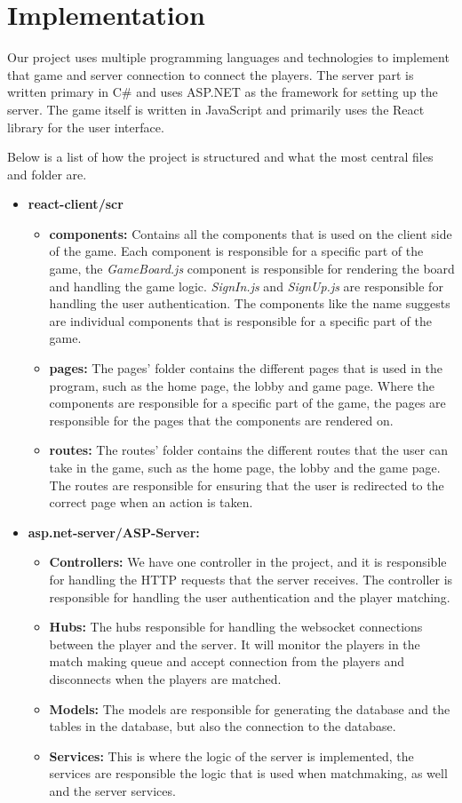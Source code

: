 \documentclass[ twoside,openright,titlepage,numbers=noenddot,headinclude,%
                footinclude=true,cleardoublepage=empty,abstractoff, %
                BCOR=5mm,paper=a4,fontsize=11pt,%
                ngerman,american,%
                ]{scrreprt}
\begin{document}
\section{Implementation}
Our project uses multiple programming languages and technologies to implement that game and server connection to connect the players. The server part is written primary in C\# and uses ASP.NET as the framework for setting up the server. The game itself is written in JavaScript and primarily uses the React library for the user interface.

Below is a list of how the project is structured and what the most central files and folder are.
\begin{itemize}
  \item \textbf{react-client/scr}
  \begin{itemize}
    \item \textbf{components:} Contains all the components that is used on the client side of the game. Each component is responsible for a specific part of the game, the \textit{GameBoard.js} component is responsible for rendering the board and handling the game logic. \textit{SignIn.js} and \textit{SignUp.js} are responsible for handling the user authentication. The components like the name suggests are individual components that is responsible for a specific part of the game. 
    \item \textbf{pages:} The pages' folder contains the different pages that is used in the program, such as the home page, the lobby and game page. Where the components are responsible for a specific part of the game, the pages are responsible for the pages that the components are rendered on.
    \item \textbf{routes:} The routes' folder contains the different routes that the user can take in the game, such as the home page, the lobby and the game page. The routes are responsible for ensuring that the user is redirected to the correct page when an action is taken.
  \end{itemize}
  \item \textbf{asp.net-server/ASP-Server:}
  \begin{itemize}
    \item \textbf{Controllers:} We have one controller in the project, and it is responsible for handling the HTTP requests that the server receives. The controller is responsible for handling the user authentication and the player matching.
    \item \textbf{Hubs:} The hubs responsible for handling the websocket connections between the player and the server. It will monitor the players in the match making queue and accept connection from the players and disconnects when the players are matched. 
    \item \textbf{Models:} The models are responsible for generating the database and the tables in the database, but also the connection to the database.   
    \item \textbf{Services:} This is where the logic of the server is implemented, the services are responsible the logic that is used when matchmaking, as well and the server services.
    \end{itemize}
\end{itemize}
\end{document}
